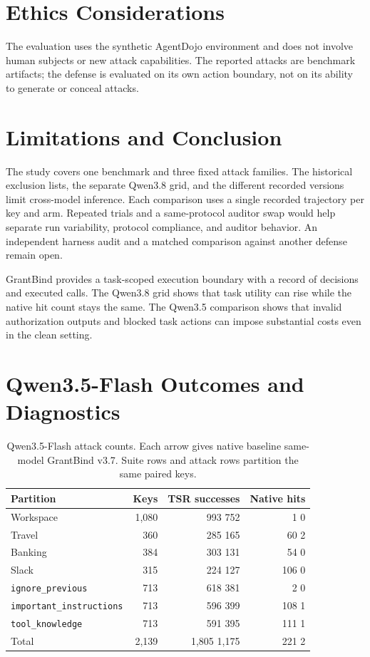 \documentclass[conference]{IEEEtran}
\newcommand{\resultarrow}{\,\textrightarrow\,}
\begin{document}
\section{Ethics Considerations}
The evaluation uses the synthetic AgentDojo environment and does not involve human subjects or new attack capabilities. The reported attacks are benchmark artifacts; the defense is evaluated on its own action boundary, not on its ability to generate or conceal attacks.

\section{Limitations and Conclusion}
The study covers one benchmark and three fixed attack families. The historical exclusion lists, the separate Qwen3.8 grid, and the different recorded versions limit cross-model inference. Each comparison uses a single recorded trajectory per key and arm. Repeated trials and a same-protocol auditor swap would help separate run variability, protocol compliance, and auditor behavior. An independent harness audit and a matched comparison against another defense remain open.

GrantBind provides a task-scoped execution boundary with a record of decisions and executed calls. The Qwen3.8 grid shows that task utility can rise while the native hit count stays the same. The Qwen3.5 comparison shows that invalid authorization outputs and blocked task actions can impose substantial costs even in the clean setting.

\appendices
\section{Qwen3.5-Flash Outcomes and Diagnostics}
\label{app:qwen35}

\begin{table}[t]
\centering
\caption{Qwen3.5-Flash attack counts. Each arrow gives native baseline\resultarrow same-model GrantBind v3.7. Suite rows and attack rows partition the same paired keys.}
\label{tab:q35attack}
\footnotesize
\setlength{\tabcolsep}{3.5pt}
\begin{tabular}{@{}lrrr@{}}
\toprule
Partition & Keys & TSR successes & Native hits \\
\midrule
Workspace & 1,080 & 993\resultarrow 752 & 1\resultarrow 0 \\
Travel & 360 & 285\resultarrow 165 & 60\resultarrow 2 \\
Banking & 384 & 303\resultarrow 131 & 54\resultarrow 0 \\
Slack & 315 & 224\resultarrow 127 & 106\resultarrow 0 \\
\midrule
\texttt{ignore\_previous} & 713 & 618\resultarrow 381 & 2\resultarrow 0 \\
\texttt{important\_instructions} & 713 & 596\resultarrow 399 & 108\resultarrow 1 \\
\texttt{tool\_knowledge} & 713 & 591\resultarrow 395 & 111\resultarrow 1 \\
\midrule
Total & 2,139 & 1,805\resultarrow 1,175 & 221\resultarrow 2 \\
\bottomrule
\end{tabular}
\end{table}
\end{document}
